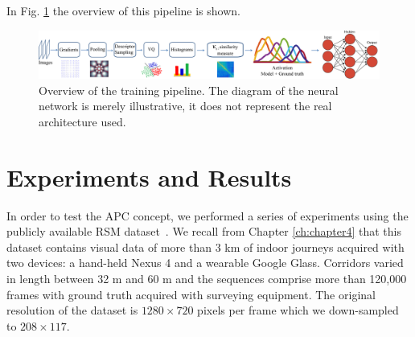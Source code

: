 In Fig. \ref{fig:pipeline} the overview of this pipeline is shown.


\begin{figure}[h]
\centering
\includegraphics[width=\linewidth]{gfx/Chapter05/nn_pipeline.pdf}
\caption{Overview of the training pipeline. The diagram of the neural network is merely illustrative, it does not represent the real architecture used.}
\label{fig:pipeline}
\end{figure}




\section{Experiments and Results}
\label{sec:ch5experiments}

In order to test the APC concept, we performed a series of experiments using the publicly available RSM dataset~\cite{RiveraWearable}. We recall from Chapter \ref{ch:chapter4} that this dataset contains visual data of more than 3 km of indoor journeys acquired with two devices: a hand-held Nexus 4 and a wearable Google Glass. Corridors varied in length between 32 m and 60 m and the sequences comprise more than 120,000 frames with ground truth acquired with surveying equipment. The original resolution of the dataset is $1280 \times 720$ pixels per frame which we down-sampled to $208 \times 117$. 



